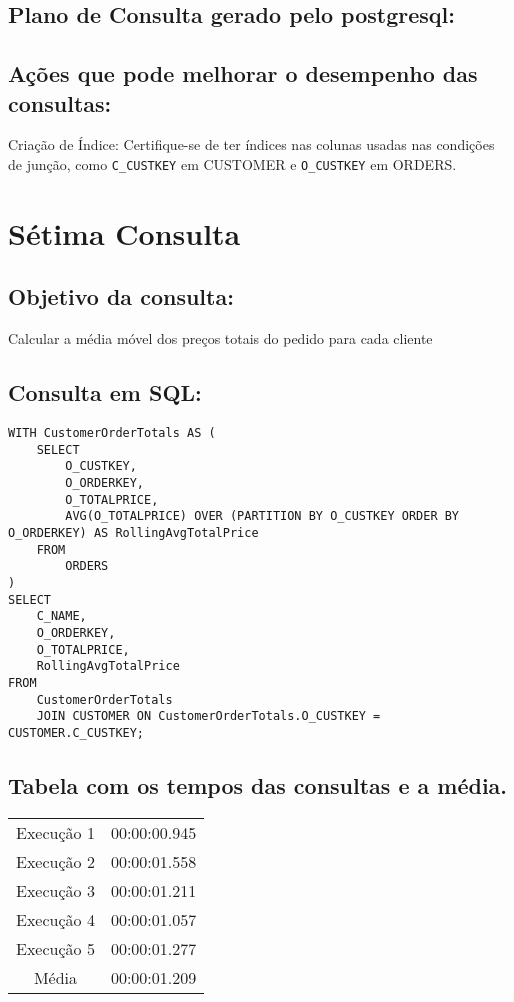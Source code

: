 \documentclass[12pt]{article}
\begin{document}
\begin{landscape}
\subsection{Plano de Consulta gerado pelo postgresql:}

\subsection{Ações que pode melhorar o desempenho das 
consultas:} Criação de Índice: Certifique-se de ter índices nas colunas usadas nas condições de junção, como \texttt{C\_CUSTKEY} em CUSTOMER e \texttt{O\_CUSTKEY} em ORDERS.
\section{Sétima Consulta}


\subsection{Objetivo da consulta:}
Calcular a média móvel dos preços totais do pedido para cada cliente

\subsection{Consulta em SQL:}
\begin{lstlisting}
WITH CustomerOrderTotals AS (
    SELECT
        O_CUSTKEY,
        O_ORDERKEY,
        O_TOTALPRICE,
        AVG(O_TOTALPRICE) OVER (PARTITION BY O_CUSTKEY ORDER BY O_ORDERKEY) AS RollingAvgTotalPrice
    FROM
        ORDERS
)
SELECT
    C_NAME,
    O_ORDERKEY,
    O_TOTALPRICE,
    RollingAvgTotalPrice
FROM
    CustomerOrderTotals
    JOIN CUSTOMER ON CustomerOrderTotals.O_CUSTKEY = CUSTOMER.C_CUSTKEY;

\end{lstlisting}

\subsection{Tabela com os tempos das consultas e a média.}
\begin{tabular}{|c|c|}
  \hline
  Execução 1 & 00:00:00.945 \\
  Execução 2 & 00:00:01.558 \\
  Execução 3 & 00:00:01.211 \\
  Execução 4 & 00:00:01.057 \\
  Execução 5 & 00:00:01.277 \\
  \hline
  Média & 00:00:01.209 \\
  \hline
\end{tabular}


\end{landscape}
\end{document}
